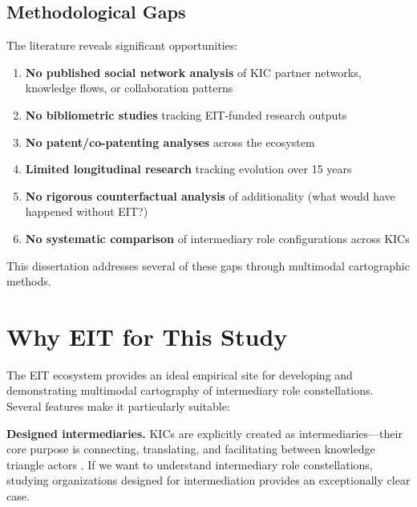 \documentclass[../main.tex]{subfiles}
\begin{document}
\subsection*{Methodological Gaps}

The literature reveals significant opportunities:

\begin{enumerate}[leftmargin=*, itemsep=0.3em]
\item \textbf{No published social network analysis} of KIC partner networks, knowledge flows, or collaboration patterns
\item \textbf{No bibliometric studies} tracking EIT-funded research outputs
\item \textbf{No patent/co-patenting analyses} across the ecosystem
\item \textbf{Limited longitudinal research} tracking evolution over 15 years
\item \textbf{No rigorous counterfactual analysis} of additionality (what would have happened without EIT?)
\item \textbf{No systematic comparison} of intermediary role configurations across KICs
\end{enumerate}

This dissertation addresses several of these gaps through multimodal cartographic methods.


\section*{Why EIT for This Study}

The EIT ecosystem provides an ideal empirical site for developing and demonstrating multimodal cartography of intermediary role constellations. Several features make it particularly suitable:

\textbf{Designed intermediaries.} KICs are explicitly created as intermediaries---their core purpose is connecting, translating, and facilitating between knowledge triangle actors \cite{howells2006intermediation,vanLente2003roles}. If we want to understand intermediary role constellations, studying organizations designed for intermediation provides an exceptionally clear case.
\end{document}
